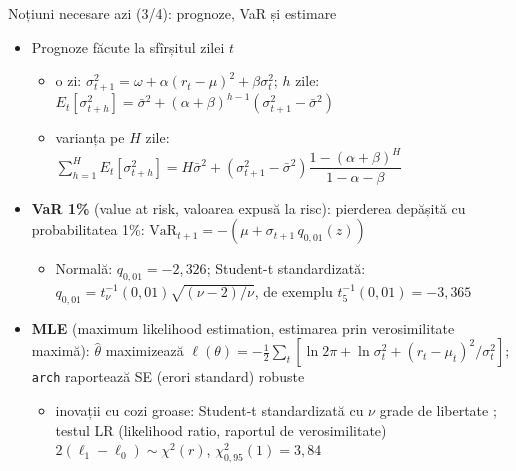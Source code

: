\begin{frame}{Noțiuni necesare azi (3/4): prognoze, VaR și estimare}
\itemsize{\small}
\begin{itemize}
    \item Prognoze făcute la sfîrșitul zilei $t$
    \begin{itemize}
        \item o zi: $\sigma_{t+1}^2 = \omega + \alpha(r_t - \mu)^2 + \beta\sigma_t^2$; $h$ zile: $E_t[\sigma_{t+h}^2] = \bar\sigma^2 + (\alpha + \beta)^{h-1}(\sigma_{t+1}^2 - \bar\sigma^2)$
        \item varianța pe $H$ zile: $\sum_{h=1}^{H}E_t[\sigma_{t+h}^2] = H\bar\sigma^2 + (\sigma_{t+1}^2 - \bar\sigma^2)\dfrac{1 - (\alpha + \beta)^H}{1 - \alpha - \beta}$
    \end{itemize}
    \item \textbf{VaR 1\%} (value at risk, valoarea expusă la risc): pierderea depășită cu probabilitatea 1\%: $\mathrm{VaR}_{t+1} = -(\mu + \sigma_{t+1}\,q_{0{,}01}(z))$
    \begin{itemize}
        \item Normală: $q_{0{,}01} = -2{,}326$; Student-t standardizată: $q_{0{,}01} = t_\nu^{-1}(0{,}01)\sqrt{(\nu - 2)/\nu}$, de exemplu $t_5^{-1}(0{,}01) = -3{,}365$
    \end{itemize}
    \item \textbf{MLE} (maximum likelihood estimation, estimarea prin verosimilitate maximă): $\hat\theta$ maximizează $\ell(\theta) = -\frac12\sum_t[\ln 2\pi + \ln\sigma_t^2 + (r_t - \mu_t)^2/\sigma_t^2]$; \texttt{arch} raportează SE (erori standard) robuste 
    \begin{itemize}
        \item inovații cu cozi groase: Student-t standardizată cu $\nu$ grade de libertate ; testul LR (likelihood ratio, raportul de verosimilitate) $2(\ell_1 - \ell_0) \sim \chi^2(r)$, $\chi^2_{0{,}95}(1) = 3{,}84$
    \end{itemize}
\end{itemize}
\end{frame}

